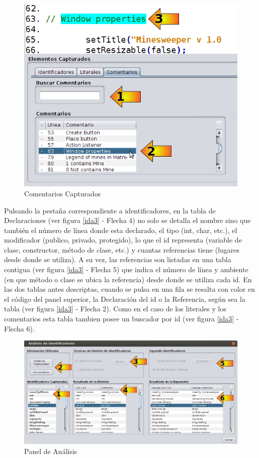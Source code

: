 \documentclass[a4paper,12pt]{report}
\begin{document}
\begin{figure}[t] %
\centerline{%
\includegraphics[scale= 0.55]{./ida_05.png}
}
\caption{Comentarios Capturados}
\label{ida5}
\end{figure}

Pulsando la pestaña correspondiente a identificadores, en la tabla de Declaraciones (ver figura \ref{ida3} - Flecha 4) no solo se detalla el nombre sino que también el número de línea donde esta declarado, el tipo (int, char, etc.), el modificador (publico, privado, protegido), lo que el id representa (variable de clase, constructor, método de clase, etc.) y cuantas referencias tiene (lugares desde donde se utiliza). A su vez, las referencias son listadas en una tabla contigua (ver figura \ref{ida3} - Flecha 5) que indica el número de línea y ambiente (en que método o clase se ubica la referencia) desde donde se utiliza cada id. En las dos tablas antes descriptas, cuando se pulsa en una fila se resalta con color en el código del panel superior, la Declaración del id o la Referencia, según sea la tabla (ver figura \ref{ida3} - Flecha 2). Como en el caso de los literales y los comentarios esta tabla tambien posee un buscador por id (ver figura \ref{ida3} - Flecha 6). 

\begin{figure}[t] %
\centerline{%
\includegraphics[scale= 0.52]{./ida_06.png}
}
\caption{Panel de Análisis}
\label{ida6}
\end{figure}
\end{document}
